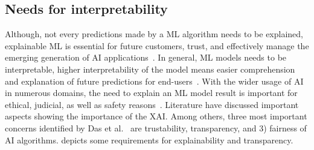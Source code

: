 \subsection{Needs for interpretability}
Although, not every predictions made by a ML algorithm needs to be explained, explainable ML is essential for future customers, trust, and effectively manage the emerging generation of AI applications~\cite{das2020opportunities}. In general, ML models needs to be interpretable, higher interpretability of the model means easier comprehension and explanation of future predictions for end-users~\cite{stiglic2020interpretability}. With the wider usage of AI in numerous domains, the need to explain an ML model result is important for ethical, judicial, as well as safety reasons~\cite{das2020opportunities}. Literature have discussed important aspects showing the importance of the XAI. Among others, three most important concerns identified by Das et al.~\cite{das2020opportunities} are trustability, transparency, and 3) fairness of AI algorithms.  depicts some requirements for explainability and transparency. 

